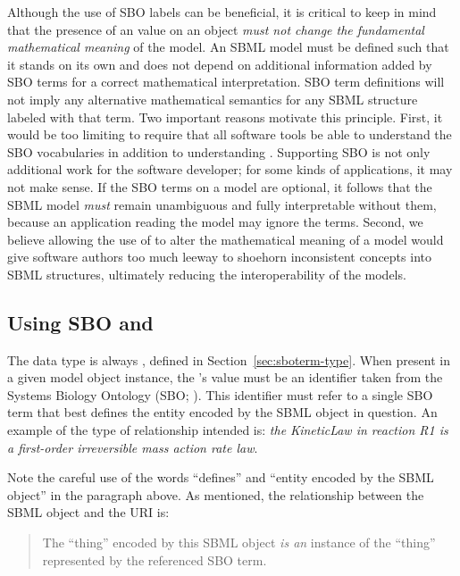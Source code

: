 Although the use of SBO labels can be beneficial, it is critical
to keep in mind that the presence of an  value on
an object \emph{must not change the fundamental mathematical
  meaning} of the model.  An SBML model must be defined such that
it stands on its own and does not depend on additional information
added by SBO terms for a correct mathematical interpretation.  SBO
term definitions will not imply any alternative mathematical
semantics for any SBML structure labeled with that term.  Two
important reasons motivate this principle.  First, it would be too
limiting to require that all software tools be able to understand
the SBO vocabularies in addition to understanding \sbmltwothree	.
Supporting SBO is not only additional work for the software
developer; for some kinds of applications, it may not make sense.
If the SBO terms on a model are optional, it follows that the SBML
model \emph{must} remain unambiguous and fully interpretable
without them, because an application reading the model may ignore
the terms.  Second, we believe allowing the use of 
to alter the mathematical meaning of a model would give software
authors too much leeway to shoehorn inconsistent concepts into
SBML structures, ultimately reducing the interoperability of the
models.

\subsection{Using SBO and }

The   data type is always ,
defined in Section~\ref{sec:sboterm-type}.  When present in a
given model object instance, the 's value must be an
identifier taken from the Systems Biology Ontology (SBO; \sboref).
This identifier must refer to a single SBO term that best defines
the entity encoded by the SBML object in question.  An example of
the type of relationship intended is: \emph{the KineticLaw in
  reaction R1 is a first-order irreversible mass action rate law}.

Note the careful use of the words ``defines'' and ``entity encoded
by the SBML object'' in the paragraph above.  As mentioned, the
relationship between the SBML object and the URI is:
\begin{quote}
  The ``thing'' encoded by this SBML object \emph{is an} instance
  of the ``thing'' represented by the referenced SBO term.
\end{quote}


